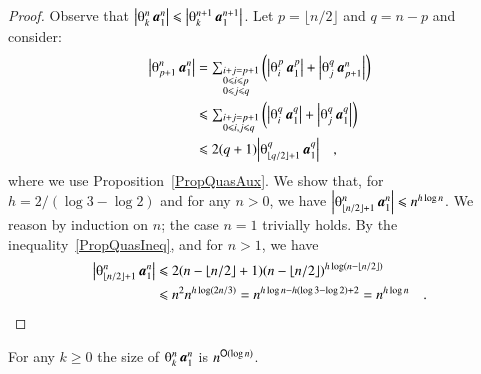 \begin{proof}
Observe that $\size{\th kn\avec1n}\le\size{\th k{n+1}\avec1{n+1}}$. Let $p=\lfloor n/2\rfloor$ and $q=n-p$ and consider:
\begin{equation}\label{PropQuasIneq}
\begin{split}
\size{\th{p+1}n\avec1n}
&=\textstyle\sum_{\begin{subarray}{l}i+j=p+1    \\
                                     0\le i\le p\\
                                     0\le j\le q
                  \end{subarray}}
  \left(\size{\th ip\avec1p}+
        \size{\th jq\avec{p+1}n}\right)             \\
&\le\textstyle\sum_{\begin{subarray}{l}i+j=p+1\\
                                       0\le i,j\le q
                    \end{subarray}}
  \left(\size{\th iq\avec1q}+
        \size{\th jq\avec1q}\right)                 \\
&\le2(q+1)
  \size{\th{\lfloor q/2\rfloor+1}q\avec1q}\quad,
\end{split}
\end{equation}
where we use Proposition~\ref{PropQuasAux}. We show that, for $h=2/(\log3-\log2)$ and for any $n>0$, we have $\size{\th{\lfloor n/2\rfloor+1}n\avec1n}\le n^{h\log n}$. We reason by induction on $n$; the case $n=1$ trivially holds. By the inequality~\eqref{PropQuasIneq}, and for $n>1$, we have
\begin{equation*}
\begin{split}
\size{\th{\lfloor n/2\rfloor+1}n\avec1n}
&\le2(n-\lfloor n/2\rfloor+1)
     (n-\lfloor n/2\rfloor)^{h\log(n-\lfloor n/2\rfloor)}       \\
&\le n^2n^{h\log(2n/3)}=n^{h\log n-h(\log3-\log2)+2}=n^{h\log n}
\quad.
\end{split}
\end{equation*}
\end{proof}

\begin{theorem}\label{TheoQuas}
For any $k\ge0$ the size of\/ $\th kn\avec1n$ is $n^{{\mathsf O}(\log n)}$.
\end{theorem}

